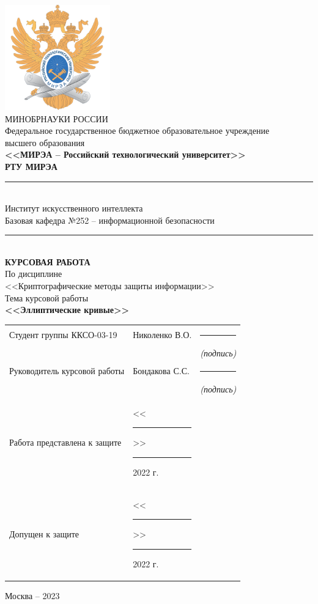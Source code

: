 \documentclass[utf8,14pt,a4paper,oneside,russian]{book}
\begin{document}
\thispagestyle{empty}
\small
\begin{center}
    \includegraphics[width=4.55cm]{logo_mirea}\\
    \MakeUppercase{Минобрнауки России}\\[1em]
    Федеральное государственное бюджетное образовательное учреждение\\
    высшего образования\\[0.5em]
    \textbf{<<МИРЭА -- Российский технологический университет>>}\\
    \textbf{РТУ МИРЭА}\\
    \rule{\textwidth}{0.75pt}\\
    Институт искусственного интеллекта\\
    Базовая кафедра №252 -- информационной безопасности\\[-0.45em]
    \rule{\textwidth}{0.75pt}\\[5em]
    \normalsize\MakeUppercase{\textbf{Курсовая работа}}\small\\[0.5em]
    По дисциплине\\ <<Криптографические методы защиты информации>>\\[1.5em]
    Тема курсовой работы\\ \textbf{<<Эллиптические кривые>>} \\[3em]
    \begin{tabular}{p{7cm}p{6cm}c}
        Студент группы ККСО-03-19    & Николенко В.О.                                      & \rule{2cm}{0.75pt}                    \\[-0.5em]
                                     &                                                     & \footnotesize\textit{(подпись)}\small \\[1em]
        Руководитель курсовой работы & Бондакова С.С.                                      & \rule{2cm}{0.75pt}                    \\[-0.5em]
                                     &                                                     & \footnotesize\textit{(подпись)}\small \\[5em]
        Работа представлена к защите & <<\rule{0.5cm}{0.75pt}>> \rule{2cm}{0.75pt} 2022 г. &                                       \\[1em]
        Допущен к защите             & <<\rule{0.5cm}{0.75pt}>> \rule{2cm}{0.75pt} 2022 г. &                                       \\[1em]
    \end{tabular}
    \vfill
    Москва -- 2023
\end{center}
\normalsize
\newpage
\end{document}
